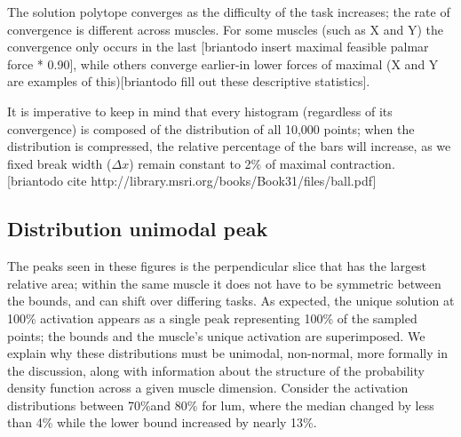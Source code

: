 The solution polytope converges as the difficulty of the task increases; the rate of convergence is different across muscles. For some muscles (such as X and Y) the convergence only occurs in the last [briantodo insert maximal feasible palmar force * 0.90], while others converge earlier-in lower forces of maximal (X and Y are examples of this)[briantodo fill out these descriptive statistics].

It is imperative to keep in mind that every histogram (regardless of its convergence) is composed of the distribution of all 10,000 points; when the distribution is compressed, the relative percentage of the bars will increase, as we fixed break width ($\Delta x$) remain constant to 2\% of maximal contraction. [briantodo cite http://library.msri.org/books/Book31/files/ball.pdf]

\subsection{Distribution unimodal peak} %
\label{sub:distribution_unimodal_peak}

The peaks seen in these figures is the perpendicular slice that has the largest relative area; within the same muscle it does not have to be symmetric between the bounds, and can shift over differing tasks. As expected, the unique solution at 100\% activation appears as a single peak representing 100\% of the sampled points; the bounds and the muscle's unique activation are superimposed. We explain why these distributions must be unimodal, non-normal, more formally in the discussion, along with information about the structure of the probability density function across a given muscle dimension. Consider the activation distributions between 70\%and 80\% for lum, where the median changed by less than 4\% while the lower bound increased by nearly 13\%.

